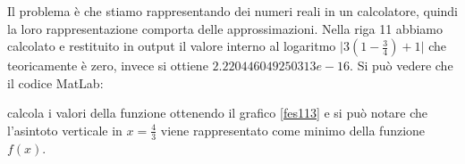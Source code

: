 Il problema è che stiamo rappresentando dei numeri reali in un calcolatore, quindi la loro rappresentazione comporta delle approssimazioni. Nella riga 11 abbiamo calcolato e restituito in output il valore interno al logaritmo $\big|3(1-\frac{3}{4})+1\big|$ che teoricamente è zero, invece si ottiene $ 2.220446049250313e-16 $. 
Si può vedere che il codice MatLab:

calcola i valori della funzione ottenendo il grafico \ref{fes113} e si può notare che l'asintoto verticale in $x=\frac{4}{3}$ viene rappresentato come minimo della funzione $f(x)$.
